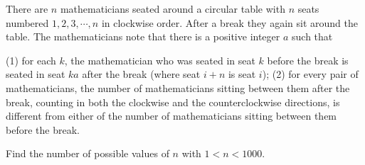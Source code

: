 There are $n$ mathematicians seated around a circular table with $n$ seats numbered $1,2,3,\cdots,n$ in clockwise order.  After a break they again sit around the table.   The mathematicians note that there is a positive integer $a$ such that

(1) for each $k$, the mathematician who was seated in seat $k$ before the break is seated in seat $ka$ after the break (where seat $i+n$ is seat $i$);
(2) for every pair of mathematicians, the number of mathematicians sitting between them after the break, counting in both the clockwise and the counterclockwise directions, is different from either of the number of mathematicians sitting between them before the break.

Find the number of possible values of $n$ with $1<n<1000$.